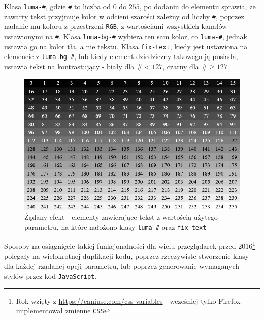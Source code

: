 \documentclass[licencjacka]{pracadypl}
\begin{document}
Klasa \texttt{luma-\#}, gdzie \texttt{\#} to liczba od $0$ do $255$, po dodaniu do elementu sprawia, że zawarty tekst przyjmuje kolor w odcieni szarości zależny od liczby \texttt{\#}, poprzez nadanie mu koloru z przestrzeni \texttt{RGB}, z wartościami wszystkich kanałów ustawionymi na \texttt{\#}. Klasa \texttt{luma-bg-\#} wybiera ten sam kolor, co \texttt{luma-\#}, jednak ustawia go na kolor tła, a nie tekstu. Klasa \texttt{fix-text}, kiedy jest ustawiona na elemencie z \texttt{luma-bg-\#}, lub kiedy element dziedziczny takowego ją posiada, ustawia tekst na kontrastujący - biały dla $\texttt{\#} < 127$, czarny dla $\texttt{\#} \geq 127$.

\begin{figure}[H]
  \centering
  \includegraphics[width=\linewidth]{images/ui-luma-grid.png}
  \caption{Żądany efekt - elementy zawierające tekst z wartością użytego parametru, na które nałożono klasy \texttt{luma-\#} oraz \texttt{fix-text}}
  \label{fig:ui-luma-grid}
\end{figure}

Sposoby na osiągnięcie takiej funkcjonalności dla wielu przeglądarek przed 2016\footnote{Rok wzięty z \url{https://caniuse.com/css-variables} - wcześniej tylko Firefox implementował zmienne \texttt{CSS}} polegały na wielokrotnej duplikacji kodu, poprzez rzeczywiste stworzenie klasy dla każdej rządanej opcji parametru, lub poprzez generowanie wymaganych stylów przez kod \texttt{JavaScript}.
\end{document}
